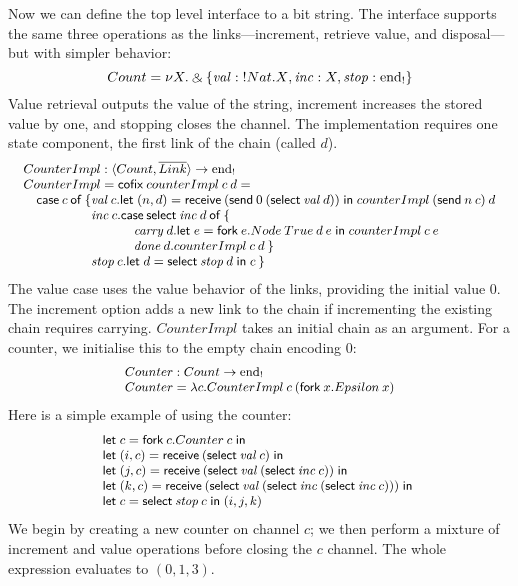 \documentclass[orivec,envcountsame]{llncs}
\makeatletter
\newcommand{\with}{\mathbin\binampersand}
\newcommand{\gvdual}[1]{\overline{#1}}
\newcommand{\gvout}[2]{{!#1.#2}}
\newcommand{\uto}{\ensuremath{\rightarrow}}
\newcommand{\outterm}{\mathrm{end}_!}
\newcommand{\mkwd}[1]{\mathsf{#1}}
\newcommand{\clabel}[1]{\mathit{#1}}
\newcommand{\gvsend}[2]{\mkwd{send}\:#1\:#2}
\newcommand{\gvreceive}[1]{\mkwd{receive}\:#1}
\newcommand{\gvlet}[3]{\mkwd{let}\;#1 = #2\;\mkwd{in}\;#3}
\newcommand{\gvselect}[2]{\mkwd{select}\:#1\:#2}
\newcommand{\gvfork}[2]{\mkwd{fork}\:#1.#2}
\newcommand{\lrkwd}{\mkwd{cofix}}
\newcommand{\ba}{\begin{array}}
\newcommand{\ea}{\end{array}}
\newcommand{\bl}{\ba[t]{@{}l@{}}}
\newcommand{\el}{\ea}
\makeatother
\begin{document}
Now we can define the top level interface to a bit string. The interface supports the same three
operations as the links---increment, retrieve value, and disposal---but with simpler behavior:
\[\small
  Count = \nu X. \with \{ \clabel{val}: \gvout{Nat}{X}, \clabel{inc}: X, \clabel{stop}: \outterm \}
\]
Value retrieval outputs the value of the string, increment increases the stored value by one, and
stopping closes the channel. The implementation requires one state component, the first link of the
chain (called $d$).
\[\small
\bl
CounterImpl : \langle Count, \gvdual{Link} \rangle \uto \outterm \\
CounterImpl = \lrkwd\:counterImpl\:c\:d = \\
\quad \mkwd{case}\:c\:\mkwd{of}\:\{
  \bl
  \clabel{val}\:c.
     \bl
     \gvlet{(n,d)}{\gvreceive{(\gvsend{0}{(\gvselect{\clabel{val}}{d})})}}
     {counterImpl\:(\gvsend{n}{c})}\:d \\
     \el \\
  \clabel{inc}\:c.
    \bl
    \mkwd{case}\:\gvselect{\clabel{inc}}{d}\:\mkwd{of}\:\{ \\
    \quad
      \bl
      \clabel{carry}\:d.
         \bl
         \gvlet{e}{\gvfork{e}{Node\:True\:d\:e}}{
         counterImpl\:c\:e} \\
         \el \\
      \clabel{done}\:d.counterImpl\:c\:d\:\} \\
      \el \\
    \el \\
  \clabel{stop}\:c.\gvlet{d}{\gvselect{\clabel{stop}}{d}}{c}\:\}
  \el \\
\el
\]
The value case uses the value behavior of the links, providing the initial value 0.  The increment
option adds a new link to the chain if incrementing the existing chain requires
carrying. $CounterImpl$ takes an initial chain as an argument. For a counter, we initialise this to
the empty chain encoding $0$:
\[\small\bl
  Counter : Count \uto \outterm \\
  Counter = \lambda c.CounterImpl\:c\:(\gvfork{x}{Epsilon\:x}) \\
\el\]
Here is a simple example of using the counter:
\[\small
\bl
\gvlet{c}{\gvfork{c}{Counter\:c}}{} \\
\gvlet{(i,c)}{\gvreceive{(\gvselect{\clabel{val}}{c})}}{} \\
\gvlet{(j,c)}{\gvreceive{(\gvselect{\clabel{val}}{(\gvselect{\clabel{inc}}{c})})}}{} \\
\gvlet{(k,c)}{\gvreceive{(\gvselect{\clabel{val}}{(\gvselect{\clabel{inc}}{(\gvselect{\clabel{inc}}{c})})})}}{} \\
\gvlet{c}{\gvselect{\clabel{stop}}{c}}{(i,j,k)}
\el
\]
We begin by creating a new counter on channel $c$; we then perform a mixture of increment and value
operations before closing the $c$ channel. The whole expression evaluates to $(0,1,3)$.
\end{document}
